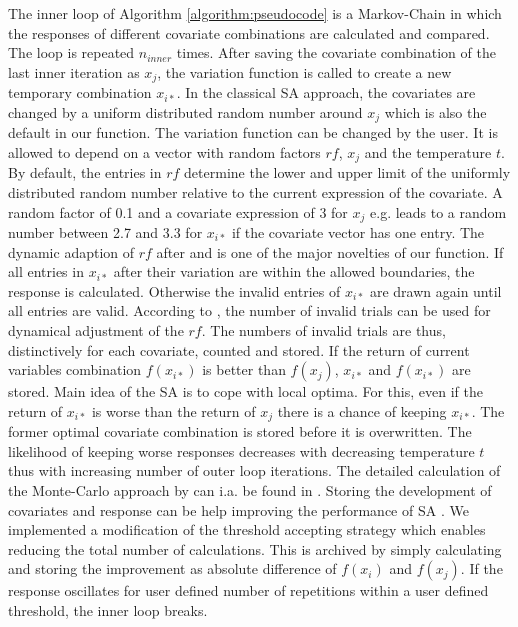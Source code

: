 The inner loop of Algorithm \ref{algorithm:pseudocode} is a Markov-Chain in which the responses of different covariate combinations are calculated and compared. The loop is repeated $n_{inner}$ times. After saving the covariate combination of the last inner iteration as $x_j$, the variation function is called to create a new temporary combination $x_{i*}$. In the classical SA approach, the covariates are changed by a uniform distributed random number around $x_j$ \citep{kirkpatrick_1983} which is also the default in our function. The variation function can be changed by the user. It is allowed to depend on a vector with random factors $rf$, $x_j$ and the temperature $t$. By default, the entries in $rf$ determine the lower and upper limit of the uniformly distributed random number relative to the current expression of the covariate. A random factor of 0.1 and a covariate expression of 3 for $x_j$ e.g. leads to a random number between 2.7 and 3.3 for $x_{i*}$ if the covariate vector has one entry. The dynamic adaption of $rf$ after \citet{corana_1987} and \citet{pronzato_1984} is one of the major novelties of our function. If all entries in $x_{i*}$ after their variation are within the allowed boundaries, the response is calculated. Otherwise the invalid entries of $x_{i*}$ are drawn again until all entries are valid. According to \citet{corana_1987}, the number of invalid trials can be used for dynamical adjustment of the $rf$. The numbers of invalid trials are thus, distinctively for each covariate, counted and stored. If the return of current variables combination $f(x_{i*})$ is better than $f(x_j)$, $x_{i*}$ and $f(x_{i*})$ are stored. Main idea of the SA is to cope with local optima. For this, even if the return of $x_{i*}$ is worse than the return of $x_{j}$ there is a chance of keeping  $x_{i*}$. The former optimal covariate combination is stored before it is overwritten. The likelihood of keeping worse responses decreases with decreasing temperature $t$ thus with increasing number of outer loop iterations. The detailed calculation of the Monte-Carlo approach by \citet{metropolis_1953} can i.a. be found in \citet{kirkpatrick_1983}. Storing the development of covariates and response can be help improving the performance of SA \citep{lin_1995, hansen_2012}. We implemented a modification of the threshold accepting strategy \citep{dueck_1990} which enables reducing the total number of calculations. This is archived by simply calculating and storing the improvement as absolute difference of $f(x_{i})$ and $f(x_j)$. If the response oscillates for user defined number of repetitions within a user defined threshold, the inner loop breaks.

